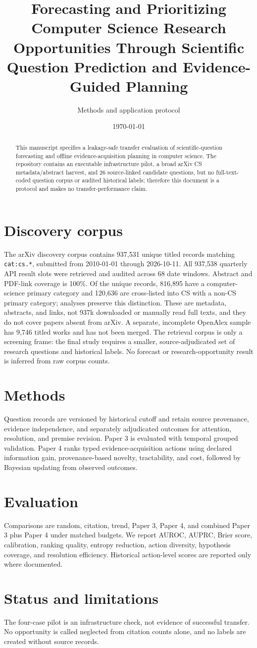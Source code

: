 \documentclass[11pt]{article}
\title{Forecasting and Prioritizing Computer Science Research Opportunities Through Scientific Question Prediction and Evidence-Guided Planning}
\author{Methods and application protocol}
\date{\today}
\begin{document}
\maketitle
\begin{abstract}
This manuscript specifies a leakage-safe transfer evaluation of scientific-question forecasting and offline evidence-acquisition planning in computer science. The repository contains an executable infrastructure pilot, a broad arXiv CS metadata/abstract harvest, and 26 source-linked candidate questions, but no full-text-coded question corpus or audited historical labels; therefore this document is a protocol and makes no transfer-performance claim.
\end{abstract}
\section{Discovery corpus}
The arXiv discovery corpus contains 937,531 unique titled records matching \texttt{cat:cs.*}, submitted from 2010-01-01 through 2026-10-11. All 937,538 quarterly API result slots were retrieved and audited across 68 date windows. Abstract and PDF-link coverage is 100\%. Of the unique records, 816,895 have a computer-science primary category and 120,636 are cross-listed into CS with a non-CS primary category; analyses preserve this distinction. These are metadata, abstracts, and links, not 937k downloaded or manually read full texts, and they do not cover papers absent from arXiv. A separate, incomplete OpenAlex sample has 9,746 titled works and has not been merged. The retrieval corpus is only a screening frame: the final study requires a smaller, source-adjudicated set of research questions and historical labels. No forecast or research-opportunity result is inferred from raw corpus counts.
\section{Methods}
Question records are versioned by historical cutoff and retain source provenance, evidence independence, and separately adjudicated outcomes for attention, resolution, and premise revision. Paper 3 is evaluated with temporal grouped validation. Paper 4 ranks typed evidence-acquisition actions using declared information gain, provenance-based novelty, tractability, and cost, followed by Bayesian updating from observed outcomes.
\section{Evaluation}
Comparisons are random, citation, trend, Paper 3, Paper 4, and combined Paper 3 plus Paper 4 under matched budgets. We report AUROC, AUPRC, Brier score, calibration, ranking quality, entropy reduction, action diversity, hypothesis coverage, and resolution efficiency. Historical action-level scores are reported only where documented.
\section{Status and limitations}
The four-case pilot is an infrastructure check, not evidence of successful transfer. No opportunity is called neglected from citation counts alone, and no labels are created without source records.
\end{document}
